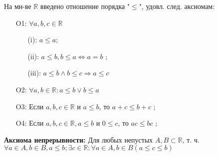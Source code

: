 \documentclass[12pt]{article}
\newcommand{\R}{\mathbb{R}}
\theoremstyle{definition}
\theoremstyle{definition}
\begin{document}
На мн-ве $\R$ введено отношение порядка "$\leq$", удовл. след. аксиомам:

\begin{itemize}
    \item [O1: ] $\forall a, b, c \in \R$ 
        \begin{itemize}
            \item [(i): ] $a \leq a$;
            \item [(ii): ] $a \leq b, b \leq a \iff a = b$ ;
            \item [(iii): ]$ a \leq b \land b \leq c \Rightarrow a \leq c$
        \end{itemize}

    \item [O2: ] $\forall a, b \in \R \colon a \leq b \lor b \leq a$
    \item [O3: ] Если $a, b, c \in \R$ и $a \leq b$, то $a + c \leq b + c$ ;
    \item [O4: ] Если $a, b, c \in \R, a \leq b$ и $0 \leq c$, то $ac \leq bc$ ;
\end{itemize}

\textbf{Аксиома непрерывности: } Для любых непустых $A, B \subset \R$, т. ч. $\forall a \in A, b \in B, a \leq b; \exists c \in \R  \colon \forall a \in A, b \in B (a \leq c \leq b)$
\end{document}

